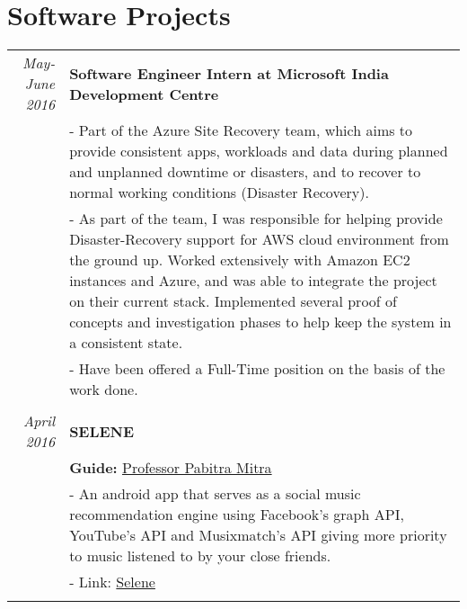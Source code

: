 \documentclass[a4paper,10pt]{article} %
\begin{document}

\section{Software Projects}

\begin{tabular}{r|p{15cm}}

\emph{May-June 2016} & \textbf{Software Engineer Intern at Microsoft India Development Centre}\\
& \footnotesize{- Part of the Azure Site Recovery team, which aims to provide consistent apps, workloads and data during planned and unplanned downtime or disasters, and to recover to normal working conditions (Disaster Recovery). }\\
& \footnotesize{- As part of the team, I was responsible for helping provide Disaster-Recovery support for AWS cloud environment from the ground up. Worked extensively with Amazon EC2 instances and Azure, and was able to integrate the project on their current stack. Implemented several proof of concepts and investigation phases to help keep the system in a consistent state.}\\
& \footnotesize{- Have been offered a Full-Time position on the basis of the work done. }\\
\multicolumn{2}{c}{} \\

\emph{April 2016} & \textbf{SELENE}\\
& \textbf{Guide: }\textmd{\href{http://cse.iitkgp.ac.in/~pabitra/}{Professor Pabitra Mitra}}\\
& \footnotesize{- An android app that serves as a social music recommendation engine using Facebook's graph API, YouTube's API and Musixmatch's API giving more priority to music listened to by your close friends.}\\
& \footnotesize{- Link: \href{http://ghostwriternr.me/Selene/}{Selene}}\\
\multicolumn{2}{c}{} \\


\end{tabular}
\end{document}
